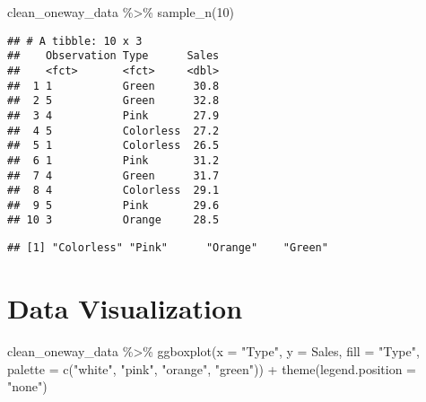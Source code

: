 \documentclass[
]{book}
\newenvironment{Shaded}{\begin{snugshade}}{\end{snugshade}}
\newcommand{\AttributeTok}[1]{\textcolor[rgb]{0.77,0.63,0.00}{#1}}
\newcommand{\DecValTok}[1]{\textcolor[rgb]{0.00,0.00,0.81}{#1}}
\newcommand{\FunctionTok}[1]{\textcolor[rgb]{0.00,0.00,0.00}{#1}}
\newcommand{\NormalTok}[1]{#1}
\newcommand{\SpecialCharTok}[1]{\textcolor[rgb]{0.00,0.00,0.00}{#1}}
\newcommand{\StringTok}[1]{\textcolor[rgb]{0.31,0.60,0.02}{#1}}
\begin{document}
\begin{Shaded}
\begin{Highlighting}[]
\NormalTok{clean\_oneway\_data }\SpecialCharTok{\%\textgreater{}\%} 
  \FunctionTok{sample\_n}\NormalTok{(}\DecValTok{10}\NormalTok{)}
\end{Highlighting}
\end{Shaded}

\begin{verbatim}
## # A tibble: 10 x 3
##    Observation Type      Sales
##    <fct>       <fct>     <dbl>
##  1 1           Green      30.8
##  2 5           Green      32.8
##  3 4           Pink       27.9
##  4 5           Colorless  27.2
##  5 1           Colorless  26.5
##  6 1           Pink       31.2
##  7 4           Green      31.7
##  8 4           Colorless  29.1
##  9 5           Pink       29.6
## 10 3           Orange     28.5
\end{verbatim}

\begin{Shaded}
\end{Shaded}

\begin{verbatim}
## [1] "Colorless" "Pink"      "Orange"    "Green"
\end{verbatim}

\hypertarget{data-visualization}{%
\chapter{Data Visualization}\label{data-visualization}}

\begin{Shaded}
\begin{Highlighting}[]
\NormalTok{clean\_oneway\_data }\SpecialCharTok{\%\textgreater{}\%} 
  \FunctionTok{ggboxplot}\NormalTok{(}\AttributeTok{x =} \StringTok{"Type"}\NormalTok{, }\AttributeTok{y =} \StringTok{\textquotesingle{}Sales\textquotesingle{}}\NormalTok{,}
            \AttributeTok{fill =} \StringTok{"Type"}\NormalTok{,}
            \AttributeTok{palette =} \FunctionTok{c}\NormalTok{(}\StringTok{"white"}\NormalTok{, }\StringTok{"pink"}\NormalTok{, }\StringTok{"orange"}\NormalTok{, }\StringTok{"green"}\NormalTok{)) }\SpecialCharTok{+} 
  \FunctionTok{theme}\NormalTok{(}\AttributeTok{legend.position =} \StringTok{"none"}\NormalTok{)}
\end{Highlighting}
\end{Shaded}
\end{document}
